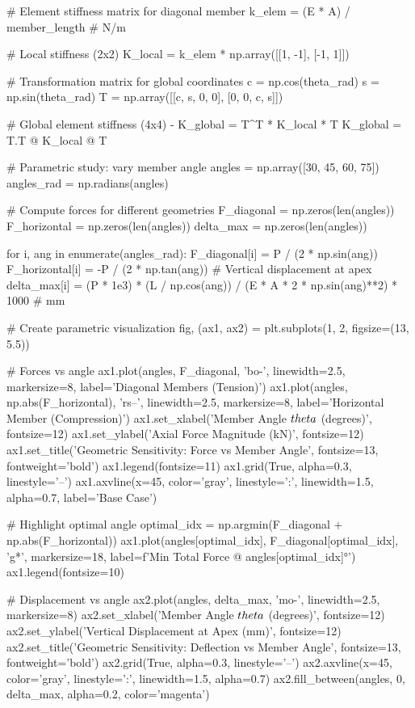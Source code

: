 \documentclass[11pt,a4paper]{article}
\begin{document}
\begin{pycode}
# Element stiffness matrix for diagonal member
k_elem = (E * A) / member_length  # N/m

# Local stiffness (2x2)
K_local = k_elem * np.array([[1, -1], [-1, 1]])

# Transformation matrix for global coordinates
c = np.cos(theta_rad)
s = np.sin(theta_rad)
T = np.array([[c, s, 0, 0],
              [0, 0, c, s]])

# Global element stiffness (4x4) - K_global = T^T * K_local * T
K_global = T.T @ K_local @ T

# Parametric study: vary member angle
angles = np.array([30, 45, 60, 75])
angles_rad = np.radians(angles)

# Compute forces for different geometries
F_diagonal = np.zeros(len(angles))
F_horizontal = np.zeros(len(angles))
delta_max = np.zeros(len(angles))

for i, ang in enumerate(angles_rad):
    F_diagonal[i] = P / (2 * np.sin(ang))
    F_horizontal[i] = -P / (2 * np.tan(ang))
    # Vertical displacement at apex
    delta_max[i] = (P * 1e3) * (L / np.cos(ang)) / (E * A * 2 * np.sin(ang)**2) * 1000  # mm

# Create parametric visualization
fig, (ax1, ax2) = plt.subplots(1, 2, figsize=(13, 5.5))

# Forces vs angle
ax1.plot(angles, F_diagonal, 'bo-', linewidth=2.5, markersize=8, label='Diagonal Members (Tension)')
ax1.plot(angles, np.abs(F_horizontal), 'rs--', linewidth=2.5, markersize=8, label='Horizontal Member (Compression)')
ax1.set_xlabel('Member Angle $\\theta$ (degrees)', fontsize=12)
ax1.set_ylabel('Axial Force Magnitude (kN)', fontsize=12)
ax1.set_title('Geometric Sensitivity: Force vs Member Angle', fontsize=13, fontweight='bold')
ax1.legend(fontsize=11)
ax1.grid(True, alpha=0.3, linestyle='--')
ax1.axvline(x=45, color='gray', linestyle=':', linewidth=1.5, alpha=0.7, label='Base Case')

# Highlight optimal angle
optimal_idx = np.argmin(F_diagonal + np.abs(F_horizontal))
ax1.plot(angles[optimal_idx], F_diagonal[optimal_idx], 'g*', markersize=18,
         label=f'Min Total Force @ {angles[optimal_idx]}°')
ax1.legend(fontsize=10)

# Displacement vs angle
ax2.plot(angles, delta_max, 'mo-', linewidth=2.5, markersize=8)
ax2.set_xlabel('Member Angle $\\theta$ (degrees)', fontsize=12)
ax2.set_ylabel('Vertical Displacement at Apex (mm)', fontsize=12)
ax2.set_title('Geometric Sensitivity: Deflection vs Member Angle', fontsize=13, fontweight='bold')
ax2.grid(True, alpha=0.3, linestyle='--')
ax2.axvline(x=45, color='gray', linestyle=':', linewidth=1.5, alpha=0.7)
ax2.fill_between(angles, 0, delta_max, alpha=0.2, color='magenta')


\end{pycode}
\end{document}
